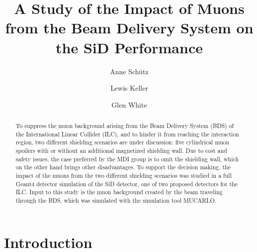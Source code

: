 \documentclass[12pt]{article}
\begin{document}

\title{A Study of the Impact of Muons from the Beam Delivery System on the SiD Performance}

\author[1,2]{Anne Sch\"utz}
\author[3]{Lewis Keller}
\author[3]{Glen White}


\maketitle

\linenumbers

\begin{abstract}
To suppress the muon background arising from the Beam Delivery System (BDS) of the International Linear Collider (ILC), and to hinder it from reaching the interaction region, two different shielding scenarios are under discussion: five cylindrical muon spoilers with or without an additional magnetized shielding wall.
Due to cost and safety issues, the case preferred by the MDI group is to omit the shielding wall, which on the other hand brings other disadvantages.
To support the decision making, the impact of the muons from the two different shielding scenarios was studied in a full Geant4 detector simulation of the SiD detector, one of two proposed detectors for the ILC. 
Input to this study is the muon background created by the beam traveling through the BDS, which was simulated with the simulation tool MUCARLO.
\end{abstract}


\section{Introduction}
\label{sec:introduction}
\end{document}
